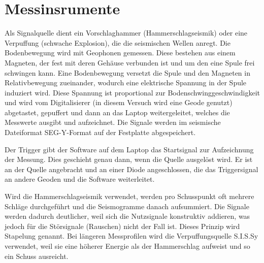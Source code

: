 \section{Messinsrumente}

Als Signalquelle dient ein Vorschlaghammer (Hammerschlagseismik) oder eine Verpuffung (schwache Explosion), die die seismischen Wellen anregt. Die Bodenbewegung wird mit Geophonen gemessen. Diese bestehen aus einem Magneten, der fest mit deren Gehäuse verbunden ist und um den eine Spule frei schwingen kann. Eine Bodenbewegung versetzt die Spule und den Magneten in Relativbewegung zueinander, wodurch eine elektrische Spannung in der Spule induziert wird. Diese Spannung ist proportional zur Bodenschwinggeschwindigkeit und wird vom Digitalisierer (in diesem Versuch wird eine Geode genutzt) abgetastet, gepuffert und dann an das Laptop weitergeleitet, welches die Messwerte ausgibt und aufzeichnet. Die Signale werden im seismische Dateiformat SEG-Y-Format auf der Festplatte abgespeichert.

Der Trigger gibt der Software auf dem Laptop das Startsignal zur Aufzeichnung der Messung. Dies geschieht genau dann, wenn die Quelle ausgelöst wird. Er ist an der Quelle angebracht und an einer Diode angeschlossen, die das Triggersignal an andere Geoden und die Software weiterleitet.  

Wird die Hammerschlagseismik verwendet, werden pro Schusspunkt oft mehrere Schläge durchgeführt und die Seismogramme danach aufsummiert. Die Signale werden dadurch deutlicher, weil sich die Nutzsignale konstruktiv addieren, was jedoch für die Störsignale (Rauschen) nicht der Fall ist. Dieses Prinzip wird Stapelung genannt. Bei längeren Messprofilen wird die Verpuffungsquelle S.I.S.Sy verwendet, weil sie eine höherer Energie als der Hammerschlag aufweist und so ein Schuss ausreicht.

